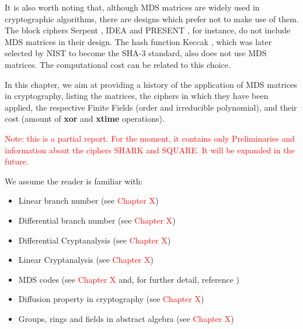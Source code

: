 \documentclass{report}
\begin{document}
It is also worth noting that, although MDS matrices are widely used in cryptographic algorithms, there are designs which prefer not to make use of them. The block ciphers Serpent \cite{Serpent1998}, IDEA \cite{IDEA2000} and PRESENT \cite{PRESENT2007}, for instance, do not include MDS matrices in their design. The hash function Keccak \cite{Keccak2013}, which was later selected by NIST to become the SHA-3 standard, also does not use MDS matrices. The computational cost can be related to this choice.

In this chapter, we aim at providing a history of the application of MDS matrices in cryptography, listing the matrices, the ciphers in which they have been applied, the respective Finite Fields (order and irreducible polynomial), and their cost (amount of \textbf{xor} and \textbf{xtime} operations).

\textcolor{red}{Note: this is a partial report. For the moment, it contains only Preliminaries and information about the ciphers SHARK and SQUARE. It will be expanded in the future.}

We assume the reader is familiar with:
\begin{itemize}
    \item Linear branch number (see \textcolor{red}{Chapter X})
    \item Differential branch number (see \textcolor{red}{Chapter X})
    \item Differential Cryptanalysis (see \textcolor{red}{Chapter X})
    \item Linear Cryptanalysis (see \textcolor{red}{Chapter X})
    \item MDS codes (see \textcolor{red}{Chapter X} and, for further detail, reference \cite{SloaneBook})
    \item Diffusion property in cryptography (see \textcolor{red}{Chapter X})
    \item Groups, rings and fields in abstract algebra (see \textcolor{red}{Chapter X})
\end{itemize}
\end{document}
